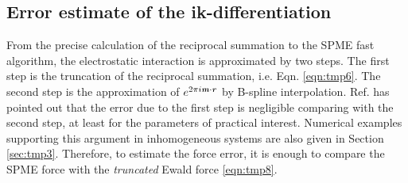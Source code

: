 \documentclass[aps,pre,preprint]{revtex4}
\renewcommand{\v}[1]{\textbf{\textit{#1}}}
\begin{document}
\subsection{Error estimate of the ik-differentiation}

From the precise calculation of the reciprocal summation to the SPME
fast algorithm, the electrostatic interaction is approximated by two
steps.  The first step is the truncation of the reciprocal summation,
i.e. Eqn. \eqref{eqn:tmp6}. The second step is the approximation of
$e^{2\pi i\v m\cdot\v r}$ by B-spline
interpolation. Ref. \cite{wang2010optimizing} has pointed out that the
error due to the first step is negligible comparing with the second
step, at least for the parameters of practical interest. Numerical
examples supporting this argument in inhomogeneous systems are also
given in Section \ref{sec:tmp3}.  Therefore, to estimate the force
error, it is enough to compare the SPME force with the
\emph{truncated} Ewald force \eqref{eqn:tmp8}. 
\end{document}
